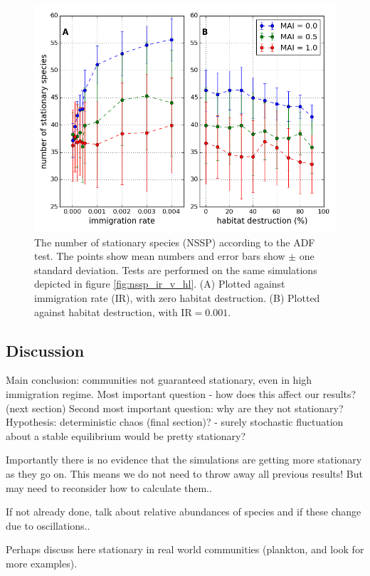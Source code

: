 \begin{figure}[h!]
	\centering
	\includegraphics[width=0.8\linewidth]{"./chapters/chapter04b/figures/nssp_v_ir_and_hl"}
    \caption{The number of stationary species (NSSP) according to the ADF test. The points show mean numbers and error bars show $\pm$ one standard deviation. Tests are performed on the same simulations depicted in figure \ref{fig:nssp_ir_v_hl}. (A) Plotted against immigration rate (IR), with zero habitat destruction. (B) Plotted against habitat destruction, with IR$=0.001$. }    
    \label{fig:nssp_v_ir_and_hl}
\end{figure}

\subsection{Discussion}
\label{sec:stationarity_discussion}

Main conclusion: communities not guaranteed stationary, even in high immigration regime. Most important question - how does this affect our results? (next section) Second most important question: why are they not stationary? Hypothesis: deterministic chaos (final section)? - surely stochastic fluctuation about a stable equilibrium would be pretty stationary?

Importantly there is no evidence that the simulations are getting more stationary as they go on. This means we do not need to throw away all previous results! But may need to reconsider how to calculate them..

If not already done, talk about relative abundances of species and if these change due to oscillations..

Perhaps discuss here stationary in real world communities (plankton, and look for more examples).

